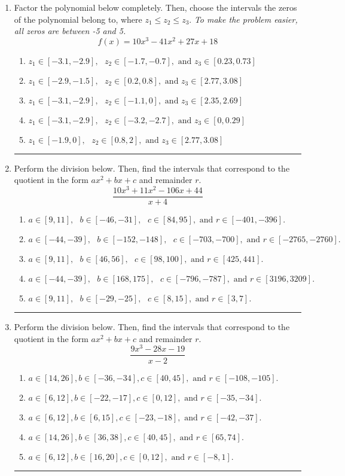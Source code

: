 \documentclass[14pt]{extbook}
\newcommand{\litem}[1]{\item#1\hspace*{-1cm}\rule{\textwidth}{0.4pt}}
\begin{document}
\begin{enumerate}
\litem{
Factor the polynomial below completely. Then, choose the intervals the zeros of the polynomial belong to, where $z_1 \leq z_2 \leq z_3$. \textit{To make the problem easier, all zeros are between -5 and 5.}\[ f(x) = 10x^{3} -41 x^{2} +27 x + 18 \]\begin{enumerate}[label=\Alph*.]
\item \( z_1 \in [-3.1, -2.9], \text{   }  z_2 \in [-1.7, -0.7], \text{   and   } z_3 \in [0.23, 0.73] \)
\item \( z_1 \in [-2.9, -1.5], \text{   }  z_2 \in [0.2, 0.8], \text{   and   } z_3 \in [2.77, 3.08] \)
\item \( z_1 \in [-3.1, -2.9], \text{   }  z_2 \in [-1.1, 0], \text{   and   } z_3 \in [2.35, 2.69] \)
\item \( z_1 \in [-3.1, -2.9], \text{   }  z_2 \in [-3.2, -2.7], \text{   and   } z_3 \in [0, 0.29] \)
\item \( z_1 \in [-1.9, 0], \text{   }  z_2 \in [0.8, 2], \text{   and   } z_3 \in [2.77, 3.08] \)

\end{enumerate} }
\litem{
Perform the division below. Then, find the intervals that correspond to the quotient in the form $ax^2+bx+c$ and remainder $r$.\[ \frac{10x^{3} +11 x^{2} -106 x + 44}{x + 4} \]\begin{enumerate}[label=\Alph*.]
\item \( a \in [9, 11], \text{   } b \in [-46, -31], \text{   } c \in [84, 95], \text{   and   } r \in [-401, -396]. \)
\item \( a \in [-44, -39], \text{   } b \in [-152, -148], \text{   } c \in [-703, -700], \text{   and   } r \in [-2765, -2760]. \)
\item \( a \in [9, 11], \text{   } b \in [46, 56], \text{   } c \in [98, 100], \text{   and   } r \in [425, 441]. \)
\item \( a \in [-44, -39], \text{   } b \in [168, 175], \text{   } c \in [-796, -787], \text{   and   } r \in [3196, 3209]. \)
\item \( a \in [9, 11], \text{   } b \in [-29, -25], \text{   } c \in [8, 15], \text{   and   } r \in [3, 7]. \)

\end{enumerate} }
\litem{
Perform the division below. Then, find the intervals that correspond to the quotient in the form $ax^2+bx+c$ and remainder $r$.\[ \frac{9x^{3} -28 x -19}{x -2} \]\begin{enumerate}[label=\Alph*.]
\item \( a \in [14, 26], b \in [-36, -34], c \in [40, 45], \text{ and } r \in [-108, -105]. \)
\item \( a \in [6, 12], b \in [-22, -17], c \in [0, 12], \text{ and } r \in [-35, -34]. \)
\item \( a \in [6, 12], b \in [6, 15], c \in [-23, -18], \text{ and } r \in [-42, -37]. \)
\item \( a \in [14, 26], b \in [36, 38], c \in [40, 45], \text{ and } r \in [65, 74]. \)
\item \( a \in [6, 12], b \in [16, 20], c \in [0, 12], \text{ and } r \in [-8, 1]. \)


\end{enumerate}}
\end{enumerate}
\end{document}
